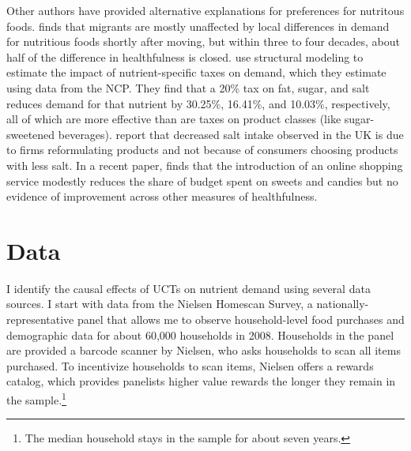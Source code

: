 \documentclass[12pt]{article}
\begin{document}
Other authors have provided alternative explanations for preferences for nutritous foods.
\textcite{hut2020determinants} finds that migrants are mostly unaffected by local differences in demand for nutritious foods shortly after moving, but within three to four decades, about half of the difference in healthfulness is closed.
\textcite{harding2017effect} use structural modeling to estimate the impact of nutrient-specific taxes on demand, which they estimate using data from the NCP.
They find that a 20\% tax on fat, sugar, and salt reduces demand for that nutrient by 30.25\%, 16.41\%, and 10.03\%, respectively, all of which are more effective than are taxes on product classes (like sugar-sweetened beverages).
\textcite{griffith2017importance} report that decreased salt intake observed in the UK is due to firms reformulating products and not because of consumers choosing products with less salt.
In a recent paper, \textcite{harris2020online} finds that the introduction of an online shopping service modestly reduces the share of budget spent on sweets and candies but no evidence of improvement across other measures of healthfulness.

\section{Data} \label{data}

I identify the causal effects of UCTs on nutrient demand using several data sources.
I start with data from the Nielsen Homescan Survey, a nationally-representative panel that allows me to observe household-level food purchases and demographic data for about 60,000 households in 2008.
Households in the panel are provided a barcode scanner by Nielsen, who asks households to scan all items purchased.
To incentivize households to scan items, Nielsen offers a rewards catalog, which provides panelists higher value rewards the longer they remain in the sample.\footnote{The median household stays in the sample for about seven years.}
\end{document}
